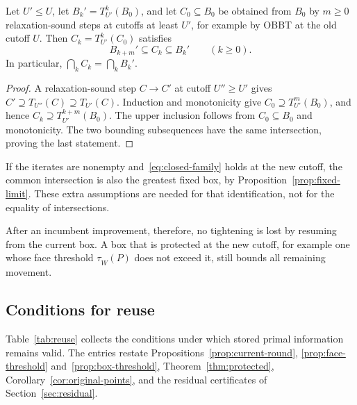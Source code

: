 \begin{proposition}\label{prop:continue}
Let $U'\le U$, let $B_k'=T_{U'}^k(B_0)$, and let
$C_0\subseteq B_0$ be obtained from $B_0$ by $m\ge0$
relaxation-sound steps at cutoffs at least $U'$, for example by OBBT
at the old cutoff $U$. Then $C_k=T_{U'}^k(C_0)$ satisfies
\[
  B_{k+m}'\subseteq C_k\subseteq B_k'\qquad(k\ge0).
\]
In particular, $\bigcap_k C_k=\bigcap_k B_k'$.
\end{proposition}
\begin{proof}
A relaxation-sound step $C\to C'$ at cutoff $U''\ge U'$ gives
$C'\supseteq T_{U''}(C)\supseteq T_{U'}(C)$. Induction and
monotonicity give $C_0\supseteq T_{U'}^m(B_0)$, and hence
$C_k\supseteq T_{U'}^{k+m}(B_0)$. The upper inclusion follows from
$C_0\subseteq B_0$ and monotonicity. The two bounding subsequences have
the same intersection, proving the last statement.
\end{proof}

If the iterates are nonempty and~\eqref{eq:closed-family} holds at the new
cutoff, the common intersection is also the greatest fixed box, by
Proposition~\ref{prop:fixed-limit}. These extra assumptions are needed
for that identification, not for the equality of intersections.

After an incumbent improvement, therefore, no tightening is lost by
resuming from the current box. A box that is protected at the new cutoff,
for example one whose face threshold $\tau_{\widehat W}(P)$ does not
exceed it, still bounds all remaining movement.

\subsection{Conditions for reuse}\label{sec:cutoff-reuse}

Table~\ref{tab:reuse} collects the conditions under which stored primal
information remains valid. The entries restate
Propositions~\ref{prop:current-round}, \ref{prop:face-threshold}
and~\ref{prop:box-threshold}, Theorem~\ref{thm:protected},
Corollary~\ref{cor:original-points}, and the residual certificates of
Section~\ref{sec:residual}.

